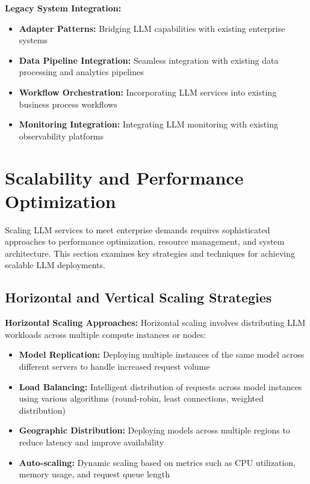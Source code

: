 \textbf{Legacy System Integration:}
\begin{itemize}
    \item \textbf{Adapter Patterns:} Bridging LLM capabilities with existing enterprise systems
    \item \textbf{Data Pipeline Integration:} Seamless integration with existing data processing and analytics pipelines
    \item \textbf{Workflow Orchestration:} Incorporating LLM services into existing business process workflows
    \item \textbf{Monitoring Integration:} Integrating LLM monitoring with existing observability platforms
\end{itemize}

\section{Scalability and Performance Optimization}

Scaling LLM services to meet enterprise demands requires sophisticated approaches to performance optimization, resource management, and system architecture. This section examines key strategies and techniques for achieving scalable LLM deployments.

\subsection{Horizontal and Vertical Scaling Strategies}

\textbf{Horizontal Scaling Approaches:}
Horizontal scaling involves distributing LLM workloads across multiple compute instances or nodes:

\begin{itemize}
    \item \textbf{Model Replication:} Deploying multiple instances of the same model across different servers to handle increased request volume
    \item \textbf{Load Balancing:} Intelligent distribution of requests across model instances using various algorithms (round-robin, least connections, weighted distribution)
    \item \textbf{Geographic Distribution:} Deploying models across multiple regions to reduce latency and improve availability
    \item \textbf{Auto-scaling:} Dynamic scaling based on metrics such as CPU utilization, memory usage, and request queue length
\end{itemize}

